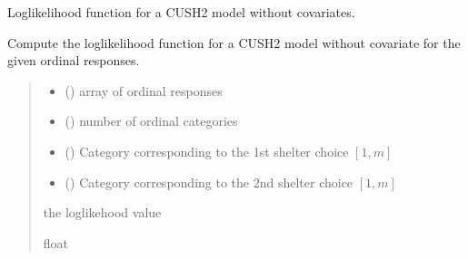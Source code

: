 \documentclass[letterpaper,10pt,english]{sphinxmanual}
\begin{document}
\begin{fulllineitems}
\label{\detokenize{cubmods:cubmods.cush2.loglik}}
\pysigstartsignatures
{}
\pysigstopsignatures
\sphinxAtStartPar
Log\sphinxhyphen{}likelihood function for a CUSH2 model without covariates.

\sphinxAtStartPar
Compute the log\sphinxhyphen{}likelihood function for a CUSH2 model 
without covariate for the given ordinal responses.
\begin{quote}\begin{description}
\begin{itemize}
\item {} 
\sphinxAtStartPar
{} () \textendash{} array of ordinal responses

\item {} 
\sphinxAtStartPar
{} () \textendash{} number of ordinal categories

\item {} 
\sphinxAtStartPar
{} () \textendash{} Category corresponding to the 1st shelter choice \([1,m]\)

\item {} 
\sphinxAtStartPar
{} () \textendash{} Category corresponding to the 2nd shelter choice \([1,m]\)

\end{itemize}

\sphinxAtStartPar
the log\sphinxhyphen{}likehood value

\sphinxAtStartPar
float

\end{description}\end{quote}

\end{fulllineitems}
\end{document}
